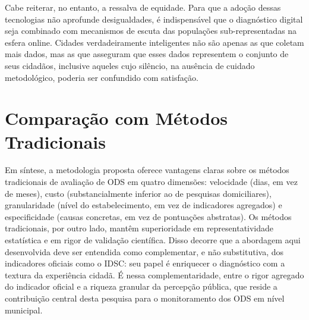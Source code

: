 Cabe reiterar, no entanto, a ressalva de equidade. Para que a adoção dessas tecnologias não aprofunde desigualdades, é indispensável que o diagnóstico digital seja combinado com mecanismos de escuta das populações sub-representadas na esfera online. Cidades verdadeiramente inteligentes não são apenas as que coletam mais dados, mas as que asseguram que esses dados representem o conjunto de seus cidadãos, inclusive aqueles cujo silêncio, na ausência de cuidado metodológico, poderia ser confundido com satisfação.

\section{Comparação com Métodos Tradicionais}
\label{sec:disc-comparacao}

Em síntese, a metodologia proposta oferece vantagens claras sobre os métodos tradicionais de avaliação de ODS em quatro dimensões: velocidade (dias, em vez de meses), custo (substancialmente inferior ao de pesquisas domiciliares), granularidade (nível do estabelecimento, em vez de indicadores agregados) e especificidade (causas concretas, em vez de pontuações abstratas). Os métodos tradicionais, por outro lado, mantêm superioridade em representatividade estatística e em rigor de validação científica. Disso decorre que a abordagem aqui desenvolvida deve ser entendida como complementar, e não substitutiva, dos indicadores oficiais como o IDSC: seu papel é enriquecer o diagnóstico com a textura da experiência cidadã. É nessa complementaridade, entre o rigor agregado do indicador oficial e a riqueza granular da percepção pública, que reside a contribuição central desta pesquisa para o monitoramento dos ODS em nível municipal.
